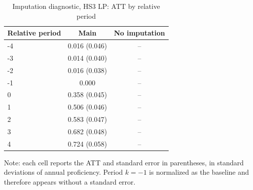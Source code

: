 ﻿\begin{table}[!htbp]
\centering
\caption{Imputation diagnostic, HS3 LP: ATT by relative period}
\label{tab:ap_event_imputacao_HS3_lp}
\vspace{-0.15cm}
\scriptsize
\setlength{\tabcolsep}{4pt}
\renewcommand{\arraystretch}{0.92}
\begin{tabular}{lcc}
\toprule
Relative period & Main & No imputation \\
\midrule
-4 & 0.016 (0.046) & -- \\
-3 & 0.014 (0.040) & -- \\
-2 & 0.016 (0.038) & -- \\
-1 & 0.000 & -- \\
0 & 0.358 (0.045) & -- \\
1 & 0.506 (0.046) & -- \\
2 & 0.583 (0.047) & -- \\
3 & 0.682 (0.048) & -- \\
4 & 0.724 (0.058) & -- \\
\bottomrule
\end{tabular}
\begin{flushleft}
\footnotesize Note: each cell reports the ATT and standard error in parentheses, in standard deviations of annual proficiency. Period \(k=-1\) is normalized as the baseline and therefore appears without a standard error.
\end{flushleft}
\end{table}



